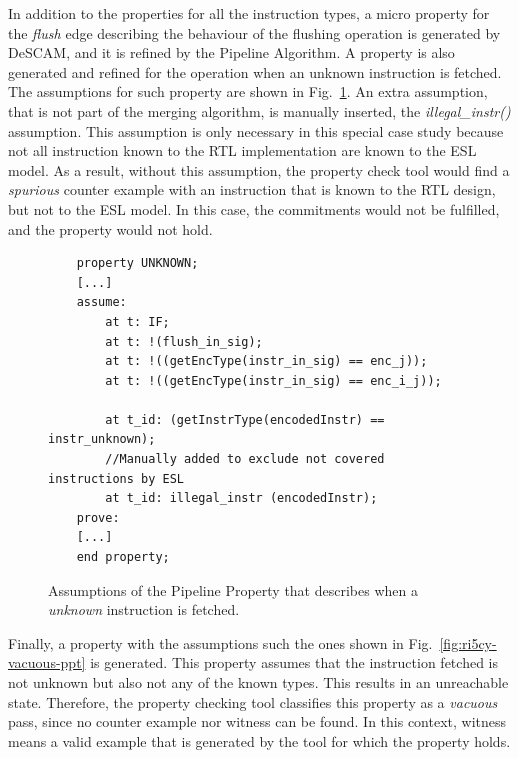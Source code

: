 In addition to the properties for all the instruction types, a micro property for the \textit{flush} edge describing the behaviour of the flushing operation is generated by DeSCAM, and it is refined by the Pipeline Algorithm. A property is also generated and refined for the operation when an unknown instruction is fetched. The assumptions for such property are shown in Fig.~\ref{fig:ri5cy-unknown-ppt}. An extra assumption, that is not part of the merging algorithm, is manually inserted, the \textit{illegal\_instr()} assumption. This assumption is only necessary in this special case study because not all instruction known to the RTL implementation are known to the ESL model. As a result, without this assumption, the property check tool would find a \textit{spurious} counter example with an instruction that is known to the RTL design, but not to the ESL model. In this case, the commitments would not be fulfilled, and the property would not hold. 

\begin{figure}[htb!]
    \begin{lstlisting}
    property UNKNOWN;
    [...]
    assume:
        at t: IF;
        at t: !(flush_in_sig);
        at t: !((getEncType(instr_in_sig) == enc_j));
        at t: !((getEncType(instr_in_sig) == enc_i_j));
        
        at t_id: (getInstrType(encodedInstr) == instr_unknown);
        //Manually added to exclude not covered instructions by ESL
        at t_id: illegal_instr (encodedInstr);
    prove:
    [...]
    end property;\end{lstlisting}
    \caption{Assumptions of the Pipeline Property that describes when a \textit{unknown} instruction is fetched.}
    \label{fig:ri5cy-unknown-ppt}
\end{figure}

Finally, a property with the assumptions such the ones shown in Fig.~\ref{fig:ri5cy-vacuous-ppt} is generated. This property assumes that the instruction fetched is not unknown but also not any of the known types. This results in an unreachable state. Therefore, the property checking tool classifies this property as a \textit{vacuous} pass, since no counter example nor witness can be found. In this context, witness means a valid example that is generated by the tool for which the property holds. 

